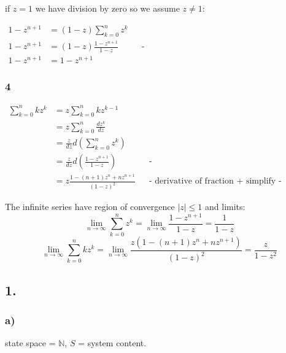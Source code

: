 if $z = 1$ we have division by zero so we assume $z \neq 1$:

\begin{align*}
    1-z^{n+1} &= (1 - z) \sum_{k=0}^{n} z^k \\
    1-z^{n+1} &= (1 - z) \frac{1 - z^{n+1}}{1-z}  && \text{-http://mathworld.wolfram.com/GeometricSeries.html-}\\
    1-z^{n+1} &= 1-z^{n+1}
\end{align*}

\subsubsection*{4}

\begin{align*}
\sum_{k=0}^{n} k z^k &= z \sum_{k=0}^{n} k z^{k-1}\\
&= z \sum_{k=0}^{n} \frac{dz^k}{dz}\\
&= \frac{z}{dz} d \left( \sum_{k=0}^{n} z^k \right)\\
&= \frac{z}{dz} d \left(\frac{1 - z^{n+1}}{1-z}\right) && \text{-http://mathworld.wolfram.com/GeometricSeries.html-}\\
&= z \frac{1-(n+1)z^n + n z^{n+1}}{(1-z)^2} && \text{- derivative of fraction + simplify -}
\end{align*}

The infinite series have region of convergence $|z| \leq 1$ and limits:
$$ \lim_{n\to\infty} \sum_{k=0}^{n} z^k = \lim_{n\to\infty} \frac{1 - z^{n+1}}{1-z} = \frac{1}{1-z} $$
$$ \lim_{n\to\infty} \sum_{k=0}^{n} k z^k = \lim_{n\to\infty} \frac{z(1-(n+1)z^n + n z^{n+1})}{(1-z)^2} = \frac{z}{1-z^2} $$

\subsection*{ 1. }

\subsubsection*{ a) }

state space = $\mathbb{N}$, $S$ = system content.

